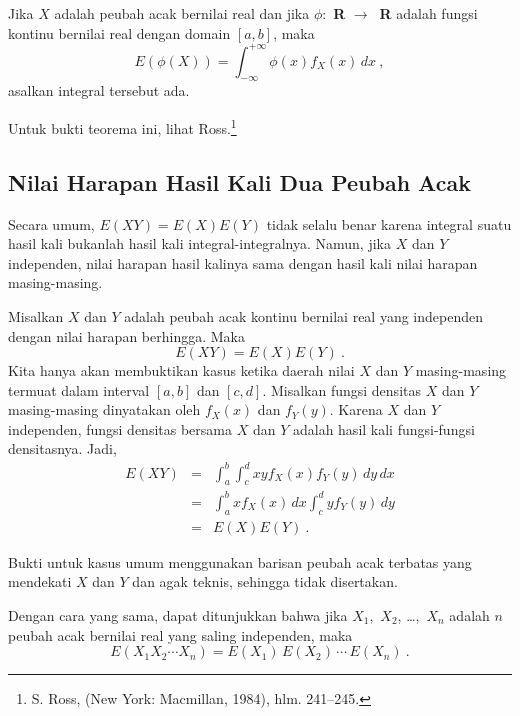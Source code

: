 {\begin{theorem}\label{thm 6.11} Jika $X$ adalah peubah acak bernilai real dan jika
$\phi :$ {\bf R} $\to\ $ {\bf R} adalah fungsi kontinu bernilai real dengan domain
$[a,b]$, maka
$$ E(\phi(X)) = \int_{-\infty}^{+\infty} \phi(x) f_X(x)\, dx\ ,
$$ asalkan integral tersebut ada.
\end{theorem}

Untuk bukti teorema ini, lihat Ross.\footnote{S. Ross,   (New York: Macmillan, 1984), hlm. 241--245.}



\subsection*{Nilai Harapan Hasil Kali Dua Peubah Acak}

Secara umum, $E(XY) = E(X)E(Y)$ tidak selalu benar karena integral suatu hasil kali
bukanlah hasil kali integral-integralnya. Namun, jika $X$ dan $Y$ independen, nilai
harapan hasil kalinya sama dengan hasil kali nilai harapan masing-masing.

\begin{theorem}\label{thm 6.12} Misalkan $X$ dan $Y$ adalah peubah acak kontinu
bernilai real yang independen dengan nilai harapan berhingga. Maka
$$ E(XY) = E(X)E(Y)\ .
$$
\proof Kita hanya akan membuktikan kasus ketika daerah nilai $X$ dan $Y$ masing-masing
termuat dalam interval $[a, b]$ dan $[c, d]$. Misalkan fungsi densitas $X$ dan $Y$
masing-masing dinyatakan oleh $f_X(x)$ dan $f_Y(y)$. Karena $X$ dan $Y$ independen,
fungsi densitas bersama $X$ dan $Y$ adalah hasil kali fungsi-fungsi densitasnya. Jadi,
\begin{eqnarray*} E(XY) & = & \int_a^b \int_c^d xy f_X(x) f_Y(y)\, dy\,dx \\
      & = & \int_a^b x f_X(x)\, dx \int_c^d y f_Y(y)\, dy \\
      & = & E(X)E(Y)\ .
\end{eqnarray*}
\par
Bukti untuk kasus umum menggunakan barisan peubah acak terbatas yang mendekati $X$
dan $Y$ dan agak teknis, sehingga tidak disertakan.
\end{theorem}

Dengan cara yang sama, dapat ditunjukkan bahwa jika $X_1$,~$X_2$, \dots,~$X_n$
adalah $n$ peubah acak bernilai real yang saling independen, maka
$$ 
E(X_1 X_2 \cdots X_n) = E(X_1)\,E(X_2)\,\cdots\,E(X_n)\ .
$$

}
